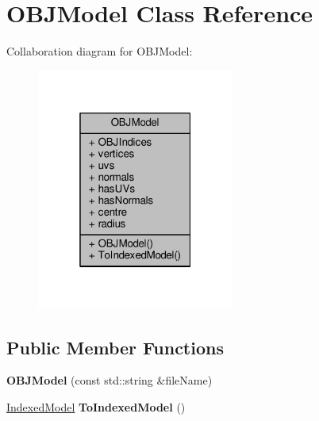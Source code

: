 \hypertarget{class_o_b_j_model}{}\section{O\+B\+J\+Model Class Reference}
\label{class_o_b_j_model}


Collaboration diagram for O\+B\+J\+Model\+:\nopagebreak
\begin{figure}[H]
\begin{center}
\leavevmode
\includegraphics[width=184pt]{class_o_b_j_model__coll__graph}
\end{center}
\end{figure}
\subsection*{Public Member Functions}
\begin{DoxyCompactItemize}
\item 
{\bfseries O\+B\+J\+Model} (const std\+::string \&file\+Name)\hypertarget{class_o_b_j_model_ac33fd4d7e20cd7ca5a82962015e91686}{}\label{class_o_b_j_model_ac33fd4d7e20cd7ca5a82962015e91686}

\item 
\hyperlink{class_indexed_model}{Indexed\+Model} {\bfseries To\+Indexed\+Model} ()\hypertarget{class_o_b_j_model_ad1e4ca6919c26a164aca9fa83523f142}{}\label{class_o_b_j_model_ad1e4ca6919c26a164aca9fa83523f142}

\end{DoxyCompactItemize}
